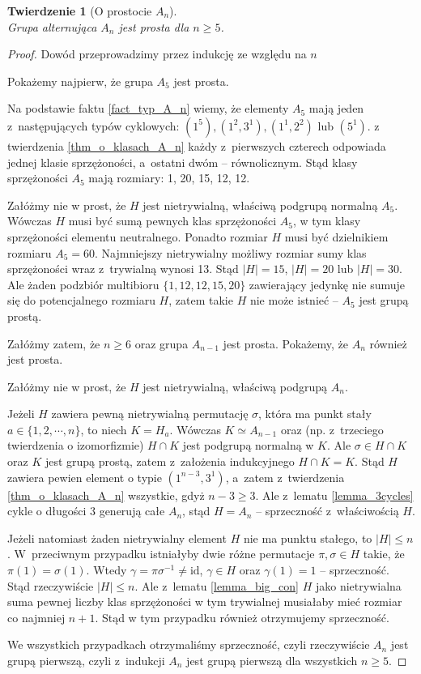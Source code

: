 \documentclass[licencjacka]{pracamgr}
\newtheorem{thh}{Twierdzenie}[section]
\begin{document}
\begin{thh}[O prostocie $A_n$] $ $ \\
	Grupa alternująca $A_n$ jest prosta dla $n \ge 5$.
\end{thh}
\begin{proof}
	Dowód przeprowadzimy przez indukcję ze względu na $n$

	Pokażemy najpierw, że grupa $A_5$ jest prosta.

	Na podstawie faktu \ref{fact_typ_A_n} wiemy, że elementy $A_5$ mają jeden z~następujących typów cyklowych:
	$(1^5), (1^2, 3^1), (1^1, 2^2)$ lub $(5^1)$.
	z twierdzenia \ref{thm_o_klasach_A_n} każdy z~pierwszych czterech odpowiada jednej klasie sprzężoności, a~ostatni dwóm -- równolicznym.
	Stąd klasy sprzężoności $A_5$ mają rozmiary: 1, 20, 15, 12, 12.

	Załóżmy nie w prost, że $H$ jest nietrywialną, właściwą podgrupą normalną $A_5$.
	Wówczas $H$ musi być sumą pewnych klas sprzężoności $A_5$, w tym klasy sprzężoności elementu neutralnego.
	Ponadto rozmiar $H$ musi być dzielnikiem rozmiaru $A_5 = 60$.
	Najmniejszy nietrywialny możliwy rozmiar sumy klas sprzężoności wraz z~trywialną wynosi 13.
	Stąd $|H| = 15$, $|H| = 20$ lub $|H| = 30$.
	Ale żaden podzbiór multibioru $\{1, 12, 12, 15, 20 \}$ zawierający jedynkę nie sumuje się do potencjalnego rozmiaru $H$,
	zatem takie $H$ nie może istnieć -- $A_5$ jest grupą prostą.

	Załóżmy zatem, że $n \ge 6$ oraz grupa $A_{n-1}$ jest prosta.
	Pokażemy, że $A_n$ również jest prosta.

	Załóżmy nie w prost, że $H$ jest nietrywialną, właściwą podgrupą $A_n$.

	Jeżeli $H$ zawiera pewną nietrywialną permutację $\sigma$, która ma punkt stały $a \in \{ 1, 2, \cdots, n \}$, to niech $K = H_a$.
	Wówczas $K \simeq A_{n-1}$ oraz (np. z~trzeciego twierdzenia o izomorfizmie) $H \cap K$ jest podgrupą normalną w $K$.
	Ale $\sigma \in H \cap K$ oraz $K$ jest grupą prostą, zatem z~założenia indukcyjnego $H \cap K = K$.
	Stąd $H$ zawiera pewien element o typie $(1^{n-3}, 3^1)$, a~zatem z~twierdzenia \ref{thm_o_klasach_A_n} wszystkie, gdyż $n-3 \ge 3$.
	Ale z~lematu \ref{lemma_3cycles} 	cykle o długości 3 generują całe $A_n$, stąd $H = A_n$ -- sprzeczność z~właściwością $H$.

	Jeżeli natomiast żaden nietrywialny element $H$ nie ma punktu stałego, to $|H| \le n$.
	W~przeciwnym przypadku istniałyby dwie różne permutacje $\pi, \sigma \in H$ takie, że $\pi(1) = \sigma(1)$.
	Wtedy $\gamma = \pi \sigma ^{-1} \ne \mathrm{id}$, $\gamma \in H$ oraz $\gamma(1) = 1$ -- sprzeczność.
	Stąd rzeczywiście $|H| \le n$.
	Ale z~lematu \ref{lemma_big_con} $H$ jako nietrywialna suma pewnej liczby klas sprzężoności w tym trywialnej musiałaby mieć rozmiar co najmniej $n+1$.
	Stąd w tym przypadku również otrzymujemy sprzeczność.

	We wszystkich przypadkach otrzymaliśmy sprzeczność, czyli rzeczywiście $A_n$ jest grupą pierwszą,
	czyli z~indukcji $A_n$ jest grupą pierwszą dla wszystkich $n \ge 5$.
\end{proof}
\end{document}
